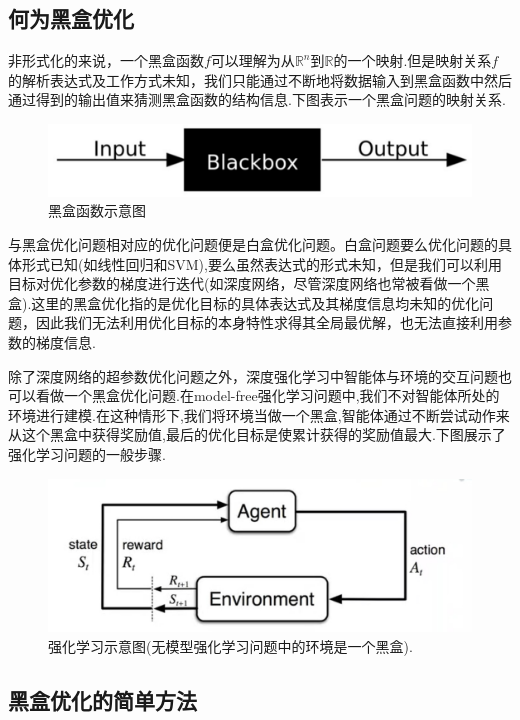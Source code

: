 \documentclass{ctexart}
\begin{document}
\subsection{何为黑盒优化}
非形式化的来说，一个黑盒函数$f$可以理解为从$\mathbb{R}^n$到$\mathbb{R}$的一个映射.但是映射关系$f$的解析表达式及工作方式未知，我们只能通过不断地将数据输入到黑盒函数中然后通过得到的输出值来猜测黑盒函数的结构信息.下图表示一个黑盒问题的映射关系.
\begin{figure}[htb!]
	\centering
	\includegraphics[scale=0.5]{blackbox.png}
	\caption{黑盒函数示意图}
\end{figure}


与黑盒优化问题相对应的优化问题便是白盒优化问题。白盒问题要么优化问题的具体形式已知(如线性回归和SVM),要么虽然表达式的形式未知，但是我们可以利用目标对优化参数的梯度进行迭代(如深度网络，尽管深度网络也常被看做一个黑盒).这里的黑盒优化指的是优化目标的具体表达式及其梯度信息均未知的优化问题，因此我们无法利用优化目标的本身特性求得其全局最优解，也无法直接利用参数的梯度信息.


除了深度网络的超参数优化问题之外，深度强化学习中智能体与环境的交互问题也可以看做一个黑盒优化问题.在model-free强化学习问题中,我们不对智能体所处的环境进行建模.在这种情形下,我们将环境当做一个黑盒,智能体通过不断尝试动作来从这个黑盒中获得奖励值,最后的优化目标是使累计获得的奖励值最大.下图展示了强化学习问题的一般步骤.\cite{sutton2018reinforcement}
\begin{figure}[htb!]
	\centering
	\includegraphics[scale=0.45]{reinforcement.jpg}
	\caption{强化学习示意图(无模型强化学习问题中的环境是一个黑盒).}
\end{figure}
\subsection{黑盒优化的简单方法}
\end{document}
